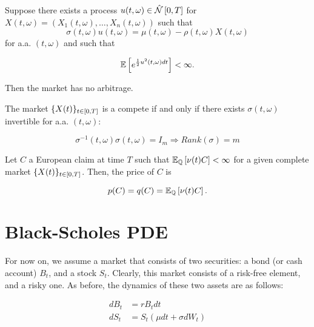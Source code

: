 \documentclass[../TGMAFFIRO.tex]{subfiles}
\begin{document}
\begin{theorem}\label{th:arbitrage_free_market}
	Suppose there exists a process $u(t,\omega) \in \hat{\mathcal{N}}\left[0, T\right]$ for $X(t,\omega) = (X_1(t,\omega), \ldots, X_n(t,\omega))$ such that
	\begin{equation}
		\sigma(t,\omega) u(t,\omega) = \mu(t, \omega) - \rho(t,\omega) X(t,\omega)
	\end{equation}
	for a.a. $(t,\omega)$ and such that
	
	\begin{equation}\label{eq:condition_arbitrage_free_market}
		\mathbb{E}\left[e^{\frac{1}{2}u^2(t,\omega) dt}\right] < \infty.
	\end{equation}
	
	Then the market has no arbitrage.
\end{theorem}

\begin{theorem}\label{th:complete_market}
	The market $\{X(t)\}_{t\in[0,T]}$ is a compete if and only if there exists $\sigma(t,\omega)$ invertible for a.a. $(t,\omega)$:
		
	\begin{equation}
		\sigma^{-1}(t,\omega) \sigma(t,\omega) = I_m \Rightarrow Rank(\sigma) = m
	\end{equation}
\end{theorem}

\begin{theorem}\label{th:european_price}
	Let $C$ a European claim at time $T$ such that $\mathbb{E}_{\mathbb{Q}}\left[\nu(t)C\right] < \infty$ for a given complete market $\{X(t)\}_{t\in[0,T]}$. Then, the price of $C$ is
	
	\begin{equation}
		p(C) = q(C) = \mathbb{E}_{\mathbb{Q}}\left[\nu(t)C\right].
	\end{equation}

\end{theorem}

\section{Black-Scholes PDE}
For now on, we assume a market that consists of two securities: a bond (or cash account) $B_t$, and a stock $S_t$. Clearly, this market consists of a risk-free element, and a risky one. As before, the dynamics of these two assets are as follows:

\begin{align}
	dB_t &= r B_t dt  \label{eq:bond_dynamics} \\
	dS_t &= S_t(\mu dt + \sigma dW_t) \label{eq:stock_dynamics}
\end{align}
\end{document}
